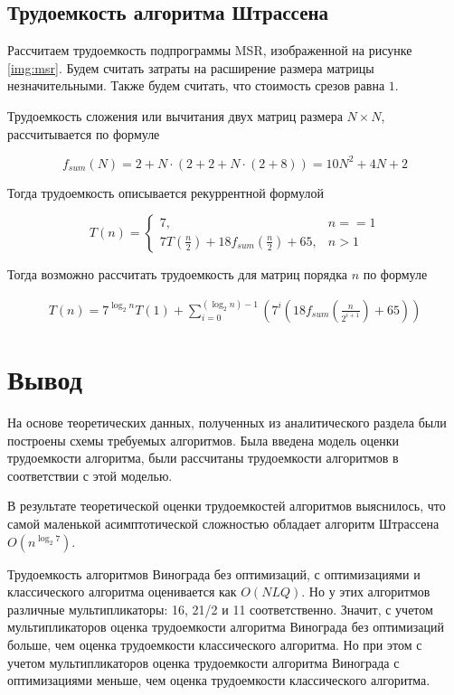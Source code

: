 \subsection{Трудоемкость алгоритма Штрассена}

Рассчитаем трудоемкость подпрограммы MSR, изображенной на рисунке \ref{img:msr}. 
Будем считать затраты на расширение размера матрицы незначительными. 
Также будем считать, что стоимость срезов равна $1$.

Трудоемкость сложения или вычитания двух матриц размера $N \times N$, рассчитывается по формуле

\begin{equation}
	\label{eq:matrix_sum}
	f_{sum}(N) = 2 + N \cdot (2 + 2 + N \cdot (2 + 8)) = 10N^2 + 4N + 2
\end{equation}

Тогда трудоемкость описывается рекуррентной формулой

\begin{equation}
	\label{eq:strassen_form}
	T(n) = 
	\begin{cases}
		7, & n == 1\\
		7T(\frac{n}{2}) + 18f_{sum}(\frac{n}{2}) + 65, & n > 1
	\end{cases}
\end{equation}

Тогда возможно рассчитать трудоемкость для матриц порядка $n$ по формуле

\begin{equation}
	\label{eq:strassen_comp}
	\begin{gathered}
		T(n) = 7^{\log_{2}{n}} T(1) + \sum_{i=0}^{(\log_{2}{n}) - 1} (7^i (18f_{sum}(\frac{n}{2 ^ {i + 1}}) + 65))
	\end{gathered}
\end{equation}


\section*{Вывод}
На основе теоретических данных, полученных из аналитического раздела были построены схемы требуемых алгоритмов. 
Была введена модель оценки трудоемкости алгоритма, были рассчитаны трудоемкости алгоритмов в соответствии с этой моделью.

В результате теоретической оценки трудоемкостей алгоритмов выяснилось, что самой маленькой асимптотической сложностью обладает алгоритм Штрассена $O(n^{\log_2{7}})$. 

Трудоемкость алгоритмов Винограда без оптимизаций, с оптимизациями и классического алгоритма оценивается как $O(NLQ)$. 
Но у этих алгоритмов различные мультипликаторы: 16, 21/2 и 11 соответственно.
Значит, с учетом мультипликаторов оценка трудоемкости алгоритма Винограда без оптимизаций больше, чем оценка трудоемкости классического алгоритма.
Но при этом с учетом мультипликаторов оценка трудоемкости алгоритма Винограда с оптимизациями меньше, чем оценка трудоемкости классического алгоритма.